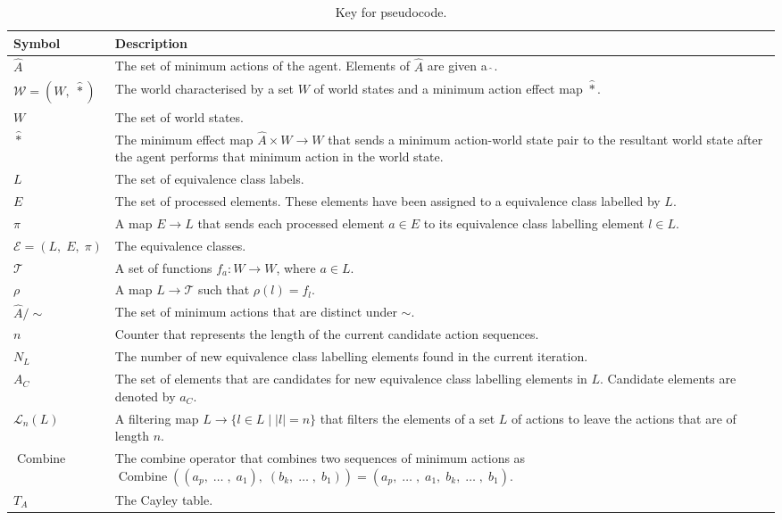 \begin{table}[H]
\begin{tabularx}{\textwidth}{lX}
\toprule
\textbf{Symbol} & \textbf{Description} \\
\midrule
$\hat{A}$ & The set of minimum actions of the agent. Elements of $\hat{A}$ are given a $\hat{\ }$. \\
$\mathscr{W} = (W, \; \hat{\ast})$ & The world characterised by a set $W$ of world states and a minimum action effect map $\hat{\ast}$. \\
$W$ & The set of world states. \\
$\hat{\ast}$ & The minimum effect map $\hat{A} \times W \to W$ that sends a minimum action-world state pair to the resultant world state after the agent performs that minimum action in the world state. \\
$L$ & The set of equivalence class labels. \\
$E$ & The set of processed elements. These elements have been assigned to a equivalence class labelled by $L$. \\
$\pi$ & A map $E \to L$ that sends each processed element $a \in E$ to its equivalence class labelling element $l \in L$. \\
$\mathcal{E} = (L, \; E, \; \pi)$ & The equivalence classes. \\
$\mathcal{T}$ & A set of functions $f_{a}: W \to W$, where $a \in L$. \\
$\rho$ & A map $L \to \mathcal{T}$ such that $\rho(l) = f_{l}$. \\
$\hat{A}/\sim$ & The set of minimum actions that are distinct under $\sim$. \\
$n$ & Counter that represents the length of the current candidate action sequences. \\
$N_{L}$ & The number of new equivalence class labelling elements found in the current iteration. \\
$A_{C}$ & The set of elements that are candidates for new equivalence class labelling elements in $L$. Candidate elements are denoted by $a_{C}$. \\
$\mathcal{L}_{n}(L)$ & A filtering map $L \to \{ l \in L \mid |l| = n \}$ that filters the elements of a set $L$ of actions to leave the actions that are of length $n$. \\
$\operatorname{Combine}$ & The combine operator that combines two sequences of minimum actions as $\operatorname{Combine}((a_{p}, \; \dots \;, \; a_{1}), \; (b_{k}, \; \dots \; , \; b_{1})) = (a_{p}, \; \dots \; , \; a_{1}, \; b_{k}, \; \dots \; , \; b_{1})$. \\
$T_{A}$ & The Cayley table. \\
\bottomrule
\end{tabularx}
\caption{Key for pseudocode.}
\label{tab:pseudocode_key}
\end{table}



